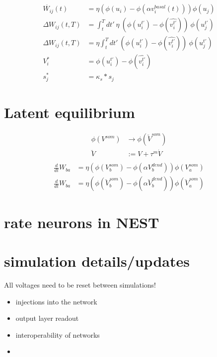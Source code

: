 \begin{align}
  \dot{W_{ij}}(t)    & = \eta (\phi(u_i) - \phi(\alpha v^{basal}_i(t))) \phi(u_j)                             \\
  \Delta W_{ij}(t,T) & = \int_t^T dt' \ \eta \  (\phi(u_i^{t'}) - \phi(\widehat{v_i^{t'}})) \  \phi(u_j^{t'}) \\
  \Delta W_{ij}(t,T) & = \eta \int_t^T dt' \  (\phi(u_i^{t'}) - \phi(\widehat{v_i^{t'}})) \ \phi(u_j^{t'})    \\
  V_i^*              & = \phi(u_i^{t'}) - \phi(\widehat{v_i^{t'}})                                            \\
  s_j^*              & = \kappa_s * s_j
\end{align}



\section{Latent equilibrium}

\begin{align}
  \phi(V^{som}) & \rightarrow \phi(\breve{V}^{som}) \\
  \breve{V}     & := V + \tau^m \dot{V}             \\
\end{align}
\begin{align}
  \frac{d}{dt} W_{ba} & = \eta (\phi(V_b^{som}) - \phi(\alpha V_b^{dend})) \phi(V_a^{som})                         \\
  \frac{d}{dt} W_{ba} & = \eta (\phi(\breve{V}_b^{som}) - \phi(\alpha \breve{V}_b^{dend})) \phi(\breve{V}_a^{som})
\end{align}


\section{rate neurons in NEST}

\section{simulation details/updates}

All voltages need to be reset between simulations!

\begin{itemize}
  \item injections into the network
  \item output layer readout
  \item interoperability of networks
  \item

\end{itemize}

